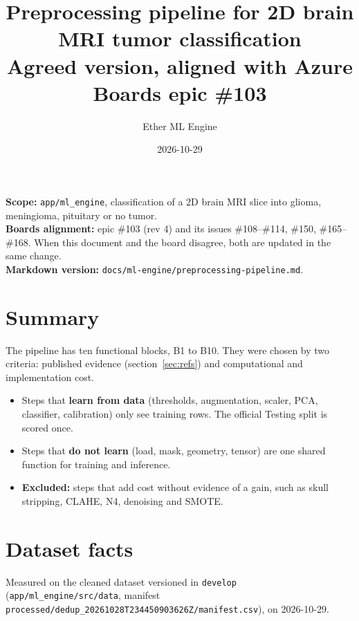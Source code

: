 \documentclass[11pt,a4paper]{article}
\title{Preprocessing pipeline for 2D brain MRI tumor classification\\[2pt]
\large Agreed version, aligned with Azure Boards epic \#103}
\author{Ether ML Engine}
\date{2026-10-29}
\newcommand{\board}[1]{\textsf{\##1}}
\begin{document}
\maketitle

\noindent\textbf{Scope:} \texttt{app/ml\_engine}, classification of a 2D brain MRI slice into glioma, meningioma, pituitary or no tumor.\\
\textbf{Boards alignment:} epic \board{103} (rev 4) and its issues \board{108}--\board{114}, \board{150}, \board{165}--\board{168}. When this document and the board disagree, both are updated in the same change.\\
\textbf{Markdown version:} \texttt{docs/ml-engine/preprocessing-pipeline.md}.

\tableofcontents

\section{Summary}

The pipeline has ten functional blocks, B1 to B10. They were chosen by two criteria: published evidence (section~\ref{sec:refs}) and computational and implementation cost.

\begin{itemize}
  \item Steps that \textbf{learn from data} (thresholds, augmentation, scaler, PCA, classifier, calibration) only see training rows. The official Testing split is scored once.
  \item Steps that \textbf{do not learn} (load, mask, geometry, tensor) are one shared function for training and inference.
  \item \textbf{Excluded:} steps that add cost without evidence of a gain, such as skull stripping, CLAHE, N4, denoising and SMOTE.
\end{itemize}

\section{Dataset facts}\label{sec:data}

Measured on the cleaned dataset versioned in \texttt{develop} (\texttt{app/ml\_engine/src/data}, manifest \texttt{processed/dedup\_20261028T234450903626Z/manifest.csv}), on 2026-10-29.
\end{document}
